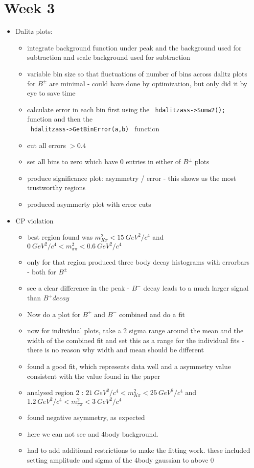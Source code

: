 \documentclass[10pt]{article}
\begin{document}
\section{Week 3}
\begin{itemize}
\item{Dalitz plots:}
\begin{itemize}
\item integrate background function under peak and the background used for subtraction and scale background used for subtraction
\item variable bin size so that fluctuations of number of bins across dalitz plots for $B^\pm$ are minimal - could have done by optimization, but only did it by eye to save time
\item calculate error in each bin first using the \verb| hdalitzass->Sumw2();| function and then the\\ \verb| hdalitzass->GetBinError(a,b) | function
\item cut all errors $> 0.4$
\item set all bins to zero which have 0 entries in either of $B^\pm$ plots
\item produce significance plot: asymmetry / error - this shows us the most trustworthy regions
\item produced asymmerty plot with error cuts
\end{itemize}

\item{CP violation}
\begin{itemize}
\item best region found was $m_{K\pi}^2 < 15~GeV^2/c^4$ and $0~GeV^2/c^4 < m_{\pi\pi}^2 < 0.6~GeV^2/c^4$
\item only for that region produced three body decay histograms with errorbars - both for $B^\pm$
\item see a clear difference in the peak - $B^-$ decay leads to a much larger signal than $B^+ decay$
\item Now do a plot for $B^+$ and $B^-$ combined and do a fit
\item now for individual plots, take a 2 sigma range around the mean and the width of the combined fit and set this as a range for the individual fits - there is no reason why width and mean should be different
\item found a good fit, which represents data well and a asymmetry value consistent with the value found in the paper
\item analysed region 2 : $21~GeV^2/c^4 < m_{K\pi}^2 < 25~GeV^2/c^4$ and $1.2~GeV^2/c^4 < m_{\pi\pi}^2 < 3~GeV^2/c^4$
\item found negative asymmetry, as expected
\item here we can not see and 4body background.
\item had to add additional restrictions to make the fitting work. these included setting amplitude and sigma of the 4body gaussian to above 0
\end{itemize}
\end{itemize}
\end{document}
